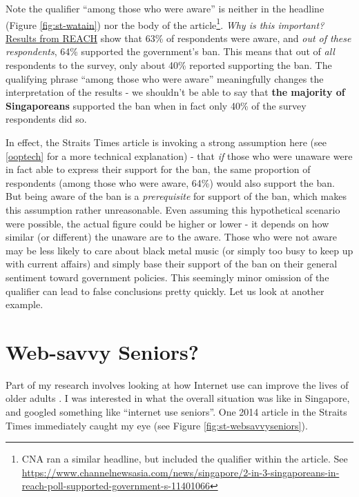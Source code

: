 \documentclass[openany]{book}
\let\rmarkdownfootnote\footnote%
\def\footnote{\protect\rmarkdownfootnote}
\begin{document}
Note the qualifier ``among those who were aware'' is neither in the
headline (Figure \ref{fig:st-watain}) nor the body of the
article\footnote{CNA ran a similar headline, but included the qualifier
  within the article. See
  \url{https://www.channelnewsasia.com/news/singapore/2-in-3-singaporeans-in-reach-poll-supported-government-s-11401066}}.
\emph{Why is this important?}
\href{https://www.reach.gov.sg/~/media/2019/press-release/findings-of-poll-on-watain-concert--1-april-2019.pdf}{Results
from REACH} show that 63\% of respondents were aware, and \emph{out of
these respondents}, 64\% supported the government's ban. This means that
out of \emph{all} respondents to the survey, only about 40\% reported
supporting the ban. The qualifying phrase ``among those who were aware''
meaningfully changes the interpretation of the results - we shouldn't be
able to say that \textbf{the majority of Singaporeans} supported the ban
when in fact only 40\% of the survey respondents did so.

In effect, the Straits Times article is invoking a strong assumption
here (see \ref{ooptech} for a more technical explanation) - that
\emph{if} those who were unaware were in fact able to express their
support for the ban, the same proportion of respondents (among those who
were aware, 64\%) would also support the ban. But being aware of the ban
is a \emph{prerequisite} for support of the ban, which makes this
assumption rather unreasonable. Even assuming this hypothetical scenario
were possible, the actual figure could be higher or lower - it depends
on how similar (or different) the unaware are to the aware. Those who
were not aware may be less likely to care about black metal music (or
simply too busy to keep up with current affairs) and simply base their
support of the ban on their general sentiment toward government
policies. This seemingly minor omission of the qualifier can lead to
false conclusions pretty quickly. Let us look at another example.

\section{Web-savvy Seniors?}\label{websavvy}

Part of my research involves looking at how Internet use can improve the
lives of older adults \citep[see][]{ang_going_2018}. I was interested in
what the overall situation was like in Singapore, and googled something
like ``internet use seniors''. One 2014 article in the Straits Times
immediately caught my eye (see Figure \ref{fig:st-websavvyseniors}).
\end{document}
